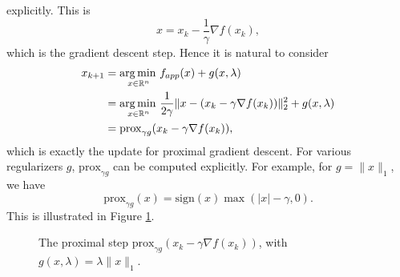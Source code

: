 \documentclass[11pt, twoside]{report}
\begin{document}
explicitly. This is
\[x = x_k - \frac{1}{\gamma} \nabla f(x_k),\]
which is the gradient descent step. Hence it is natural to consider
\begin{align*}
    x_{k+1} &= \operatorname*{arg\, min \,}_{x \in \mathbb{R}^n} f_{app}(x) + g(x,\lambda) \\
    &= \operatorname*{arg\, min \,}_{x \in \mathbb{R}^n} \frac{1}{2 \gamma} \|x - (x_k - \gamma \nabla f(x_k))\|_2^2 + g(x,\lambda) \\
    &= \mathrm{prox}_{\gamma g}(x_k - \gamma \nabla f(x_k)),
\end{align*}
which is exactly the update for proximal gradient descent. For various regularizers $g$, $\mathrm{prox}_{\gamma g}$ can be computed explicitly. For example, for $g = \|x\|_1$, we have $$\mathrm{prox}_{\gamma g}(x) = \mathrm{sign}(x) \max(|x|-\gamma,0).$$ This is illustrated in Figure \ref{fig:prox_lasso}.

\begin{figure}[h!]
    \centering
    \caption{The proximal step $\mathrm{prox}_{\gamma g}(x_k - \gamma \nabla f(x_k))$, with $g(x,\lambda) = \lambda \|x\|_1$.}
    \label{fig:prox_lasso}
\end{figure}
\end{document}

